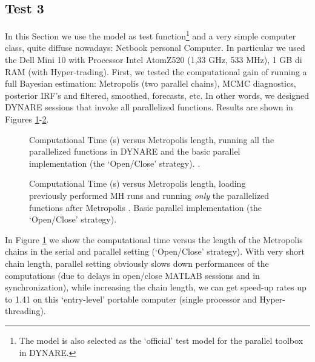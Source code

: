 \documentclass[12pt,a4paper,pdftex]{article}
\begin{document}
\subsection{Test 3}\label{s:test3}
In this Section we use the \cite{Lubik2003} model as test function\footnote{The \cite{Lubik2003} model is also selected as the `official' test model for the parallel toolbox in DYNARE.} and a very simple computer class, quite diffuse nowadays: Netbook personal Computer. In particular we used the Dell Mini 10 with Processor Intel\textsuperscript{\textregistered} Atom\texttrademark Z520 (1,33 GHz, 533 MHz), 1 GB di RAM (with Hyper-trading). First, we tested the computational gain of running a full Bayesian estimation: Metropolis (two parallel chains), MCMC diagnostics, posterior IRF's and filtered, smoothed, forecasts, etc. In other words, we designed DYNARE sessions that invoke all parallelized functions. Results are shown in Figures \ref{fig:netbook_complete_openclose}-\ref{fig:netbook_partial_openclose}.
\begin{figure}[p]
\begin{centering}
  \epsfxsize=300pt 
  \caption{Computational Time (s) versus Metropolis length, running all the parallelized functions in DYNARE and the basic parallel implementation (the `Open/Close' strategy). \citep{Lubik2003}.}\label{fig:netbook_complete_openclose}
\end{centering}
\end{figure}
\begin{figure}[p]
\begin{centering}
  \epsfxsize=300pt 
  \caption{Computational Time (s) versus Metropolis length, loading previously performed MH runs and running \emph{only} the parallelized functions after Metropolis \citep{Lubik2003}. Basic parallel implementation (the `Open/Close' strategy).}\label{fig:netbook_partial_openclose}
\end{centering}
\end{figure}
In Figure \ref{fig:netbook_complete_openclose} we show the computational time versus the length of the Metropolis chains in the serial and parallel setting (`Open/Close' strategy). With very short chain length, parallel setting obviously slows down performances of the computations (due to delays in open/close MATLAB sessions and in synchronization), while increasing the chain length, we can get speed-up rates up to 1.41 on this `entry-level' portable computer (single processor and Hyper-threading).
\end{document}
